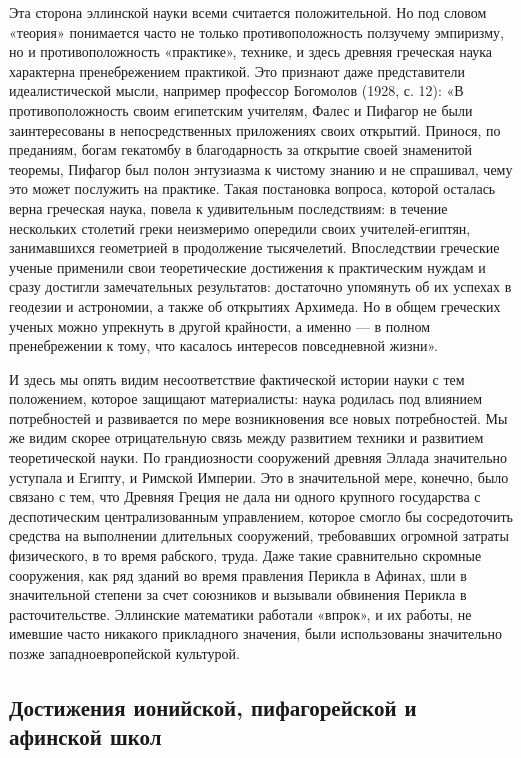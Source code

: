 Эта  сторона эллинской  науки  всеми считается  положительной. Но  под
словом «теория» понимается часто не только противоположность ползучему
эмпиризму, но и противоположность «практике», технике, и здесь древняя
греческая наука характерна пренебрежением практикой. Это признают даже
представители  идеалистической  мысли,  например  профессор  Богомолов
(1928, с. 12): «В противоположность своим египетским учителям, Фалес и
Пифагор не  были заинтересованы  в непосредственных  приложениях своих
открытий. Принося,  по преданиям,  богам гекатомбу в  благодарность за
открытие  своей знаменитой  теоремы,  Пифагор был  полон энтузиазма  к
чистому знанию и  не спрашивал, чему это может  послужить на практике.
Такая  постановка вопроса,  которой  осталась  верна греческая  наука,
повела  к удивительным  последствиям:  в  течение нескольких  столетий
греки  неизмеримо   опередили  своих   учителей-египтян,  занимавшихся
геометрией  в продолжение  тысячелетий. Впоследствии  греческие ученые
применили свои теоретические достижения  к практическим нуждам и сразу
достигли замечательных результатов: достаточно упомянуть об их успехах
в геодезии  и астрономии, а  также об  открытиях Архимеда. Но  в общем
греческих ученых  можно упрекнуть в  другой крайности, а именно  --- в
полном  пренебрежении  к  тому, что  касалось  интересов  повседневной
жизни».

И  здесь  мы  опять  видим несоответствие  фактической  истории  науки
с  тем  положением,  которое  защищают  материалисты:  наука  родилась
под  влиянием потребностей  и  развивается по  мере возникновения  все
новых  потребностей.  Мы же  видим  скорее  отрицательную связь  между
развитием техники  и развитием  теоретической науки.  По грандиозности
сооружений  древняя Эллада  значительно уступала  и Египту,  и Римской
Империи. Это  в значительной  мере, конечно, было  связано с  тем, что
Древняя Греция не дала ни  одного крупного государства с деспотическим
централизованным управлением, которое смогло бы сосредоточить средства
на  выполнении  длительных  сооружений, требовавших  огромной  затраты
физического,  в  то время  рабского,  труда.  Даже такие  сравнительно
скромные  сооружения, как  ряд  зданий во  время  правления Перикла  в
Афинах,  шли  в значительной  степени  за  счет союзников  и  вызывали
обвинения  Перикла в  расточительстве.  Эллинские математики  работали
«впрок», и их работы, не  имевшие часто никакого прикладного значения,
были использованы значительно позже западноевропейской культурой.

\subsection{Достижения ионийской, пифагорейской и афинской школ}

